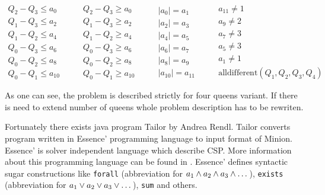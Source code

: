 \begin{equation*}
\begin{gathered}
Q_2 - Q_3 \leq a_0 \\
Q_1 - Q_3 \leq a_2 \\
Q_1 - Q_2 \leq a_4 \\
Q_0 - Q_3 \leq a_6 \\
Q_0 - Q_2 \leq a_8 \\
Q_0 - Q_1 \leq a_{10}
\end{gathered} \qquad \begin{gathered}
Q_2 - Q_3 \geq a_0 \\
Q_1 - Q_3 \geq a_2 \\
Q_1 - Q_2 \geq a_4 \\
Q_0 - Q_3 \geq a_6 \\
Q_0 - Q_2 \geq a_8 \\
Q_0 - Q_1 \geq a_{10}
\end{gathered} \qquad \begin{gathered}
| a_0 | = a_1 \\
| a_2 | = a_3 \\
| a_4 | = a_5 \\
| a_6 | = a_7 \\
| a_8 | = a_9 \\
| a_{10} | = a_{11}
\end{gathered} \qquad \begin{gathered}
a_{11} \neq 1 \\
a_9 \neq 2 \\
a_7 \neq 3 \\
a_5 \neq 3 \\
a_1 \neq 1 \\
\text{alldifferent}(Q_1,Q_2,Q_3,Q_4)
\end{gathered}
\end{equation*}

As one can see, the problem is described strictly for four queens variant. If there is 
need to extend number of queens whole problem description has to be rewriten.

Fortunately there exists java program Tailor by Andrea Rendl. Tailor converts program
written in Essence' programming language to input format of Minion. Essence' is solver
independent language which describe CSP. More information about this programming language
can be found in \cite{constraints:essence}. Essence' defines syntactic sugar constructions
like \verb=forall= (abbreviation for $a_1 \wedge a_2 \wedge a_3 \wedge \dots$), 
\verb=exists= (abbreviation for $a_1 \vee a_2 \vee a_3 \vee \dots$), \verb=sum= and others.

